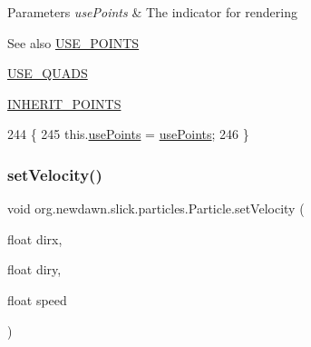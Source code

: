 \begin{DoxyParams}{Parameters}
{\em use\+Points} & The indicator for rendering \\
\hline
\end{DoxyParams}
\begin{DoxySeeAlso}{See also}
\mbox{\hyperlink{classorg_1_1newdawn_1_1slick_1_1particles_1_1_particle_afbb27555302a14e40de7feb81fd1c916}{U\+S\+E\+\_\+\+P\+O\+I\+N\+TS}} 

\mbox{\hyperlink{classorg_1_1newdawn_1_1slick_1_1particles_1_1_particle_a9a04f13945c63274a3eaf725f0bace95}{U\+S\+E\+\_\+\+Q\+U\+A\+DS}} 

\mbox{\hyperlink{classorg_1_1newdawn_1_1slick_1_1particles_1_1_particle_a6ecc8039f2f03eab74b6b22ce786d176}{I\+N\+H\+E\+R\+I\+T\+\_\+\+P\+O\+I\+N\+TS}} 
\end{DoxySeeAlso}

\begin{DoxyCode}
244                                            \{
245         this.\mbox{\hyperlink{classorg_1_1newdawn_1_1slick_1_1particles_1_1_particle_afd267c52267755cd8aacc3113dd87ed8}{usePoints}} = \mbox{\hyperlink{classorg_1_1newdawn_1_1slick_1_1particles_1_1_particle_afd267c52267755cd8aacc3113dd87ed8}{usePoints}};
246     \}
\end{DoxyCode}
\mbox{\label{classorg_1_1newdawn_1_1slick_1_1particles_1_1_particle_a7357dac12ad0fe5293111100b6ad8c61}} 
\subsubsection{\texorpdfstring{set\+Velocity()}{setVelocity()}\hspace{0.1cm}{\footnotesize\ttfamily [1/2]}}
{\footnotesize\ttfamily void org.\+newdawn.\+slick.\+particles.\+Particle.\+set\+Velocity (\begin{DoxyParamCaption}\item[{float}]{dirx,  }\item[{float}]{diry,  }\item[{float}]{speed }\end{DoxyParamCaption})\hspace{0.3cm}{\ttfamily [inline]}}

